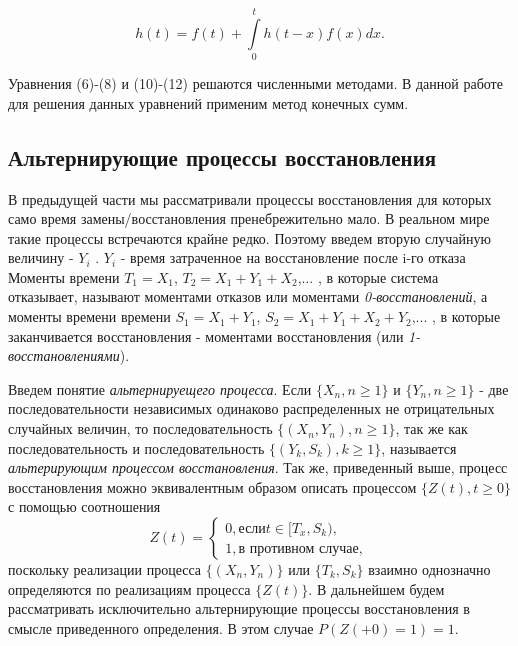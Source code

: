 \begin{equation}
h(t) = f(t) + \int\limits_0^t h(t-x) f(x) dx.
\end{equation}

Уравнения (6)-(8) и (10)-(12) решаются численными методами. В данной работе для решения данных уравнений применим метод конечных сумм.

\begin{center}
\item\subsection{Альтернирующие процессы восстановления}
\end{center}

В предыдущей части мы рассматривали процессы восстановления для которых само время замены/восстановления пренебрежительно мало. В реальном мире такие процессы встречаются крайне редко. Поэтому введем вторую случайную величину - $Y_i$ . $Y_i$ - время затраченное на восстановление после i-го отказа Моменты времени $T_1 = X_1$, $T_2 = X_1 + Y_1 + X_2$,... , в которые система отказывает, называют моментами отказов или моментами \textit{0-восстановлений}, а моменты времени времени $S_1 = X_1 + Y_1$, $S_2 = X_1 + Y_1 + X_2 + Y_2$,... , в которые заканчивается восстановления - моментами восстановления (или \textit{1-восстановлениями}).

Введем понятие \textit{альтернируещего процесса}. Если $\{X_n, n \geqslant 1\}$ и $\{Y_n, n \geqslant 1\}$ - две последовательности независимых одинаково распределенных не отрицательных случайных величин,  то последовательность $\{ (X_n, Y_n), n \geqslant 1 \}$, так же как последовательность и последовательность $\{ (Y_k, S_k), k \geqslant 1 \}$, называется \textit{альтерирующим процессом восстановления}.  Так же, приведенный выше, процесс восстановления можно эквивалентным образом описать процессом $\{ Z(t), t \geqslant 0 \}$ с помощью соотношения
\begin{equation}
Z(t) = 
\begin{cases}
0, \text{если} t\in[T_x, S_k),\\
1, \text{в противном случае},
\end{cases}
\end{equation}
поскольку  реализации процесса $\{ (X_n, Y_n) \}$ или $\{ T_k, S_k \}$ взаимно однозначно определяются по реализациям процесса $\{Z(t)\}$. В дальнейшем будем рассматривать исключительно альтернирующие процессы восстановления в смысле приведенного определения. В этом случае $P(Z(+0) = 1) = 1$.

